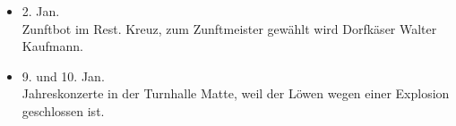 \begin{history}


    \begin{itemize}

        \item[]2. Jan.\\
        Zunftbot im Rest. Kreuz, zum Zunftmeister gewählt wird Dorfkäser Walter Kaufmann.

        \item[]9. und 10. Jan.\\
        Jahreskonzerte in der Turnhalle Matte, weil der Löwen wegen einer Explosion geschlossen ist.

    \end{itemize}

\end{history}
